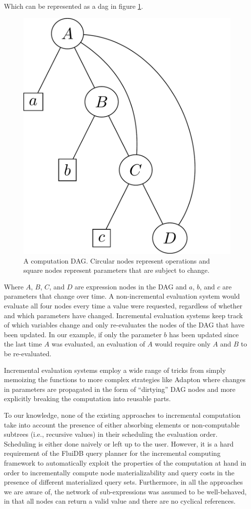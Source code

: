 Which can be represented as a dag in figure
\ref{fig:example_antisthenis_dag}.

\begin{figure}[H]
\centering
\includegraphics[width=.5\textwidth]{./imgs/example_antisthenis_dag.pdf}
\caption{\label{fig:example_antisthenis_dag}A computation
  DAG. Circular nodes represent operations and square nodes represent
  parameters that are subject to change.}
\end{figure}

Where \(A\), \(B\), \(C\), and \(D\) are expression nodes in the DAG
and \(a\), \(b\), and \(c\) are parameters that change over time. A
non-incremental evaluation system would evaluate all four nodes every
time a value were requested, regardless of whether and which
parameters have changed. Incremental evaluation systems keep track of
which variables change and only re-evaluates the nodes of the DAG that
have been updated. In our example, if only the parameter \(b\) has been
updated since the last time \(A\) was evaluated, an evaluation of
\(A\) would require only \(A\) and \(B\) to be re-evaluated.

Incremental evaluation systems employ a wide range of tricks from
simply memoizing the functions
\cite{pughIncrementalComputationFunction1989} to more complex
strategies like Adapton
\cite{hammerAdaptonComposableDemanddriven2014a} where changes in
parameters are propagated in the form of ``dirtying'' DAG nodes and
more explicitly breaking the computation into reusable parts.

To our knowledge, none of the existing approaches to incremental
computation take into account the presence of either absorbing
elements or non-computable subtrees (i.e., recursive values) in their
scheduling the evaluation order. Scheduling is either done naively or
left up to the user. However, it is a hard requirement of the FluiDB
query planner for the incremental computing framework to automatically
exploit the properties of the computation at hand in order to
incrementally compute node materializability and query costs in the
presence of different materialized query sets. Furthermore, in all the
approaches we are aware of, the network of sub-expressions was assumed
to be well-behaved, in that all nodes can return a valid value and
there are no cyclical references.

